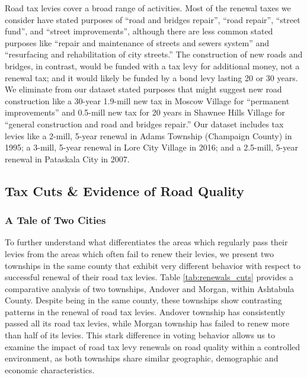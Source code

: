 Road tax levies cover a broad range of activities.  Most of the renewal taxes we consider have stated purposes of “road and bridges repair”, “road repair”, “street fund”, and “street improvements”, although there are less common stated purposes like “repair and maintenance of streets and sewers system” and “resurfacing and rehabilitation of city streets.”  The construction of new roads and bridges, in contrast, would be funded with a tax levy for additional money, not a renewal tax; and it would likely be funded by a bond levy lasting 20 or 30 years.  We eliminate from our dataset stated purposes that might suggest new road construction like a 30-year 1.9-mill new tax in Moscow Village for “permanent improvements” and 0.5-mill new tax for 20 years in Shawnee Hills Village for “general construction and road and bridges repair.” Our dataset includes tax levies like a 2-mill, 5-year renewal in Adams Township (Champaign County) in 1995; a 3-mill, 5-year renewal in Lore City Village in 2016; and a 2.5-mill, 5-year renewal in Pataskala City in 2007.


\subsection{Tax Cuts \& Evidence of Road Quality}


\subsubsection{A Tale of Two Cities}

To further understand what differentiates the areas which regularly pass their levies from the areas which often fail to renew their levies, we present two townships in the same county that exhibit very different behavior with respect to successful renewal of their road tax levies. Table \ref{tab:renewals_cuts} provides a comparative analysis of two townships, Andover and Morgan, within Ashtabula County. Despite being in the same county, these townships show contrasting patterns in the renewal of road tax levies. Andover township has consistently passed all its road tax levies, while Morgan township has failed to renew more than half of its levies. This stark difference in voting behavior allows us to examine the impact of road tax levy renewals on road quality within a controlled environment, as both townships share similar geographic,  demographic and economic characteristics.

